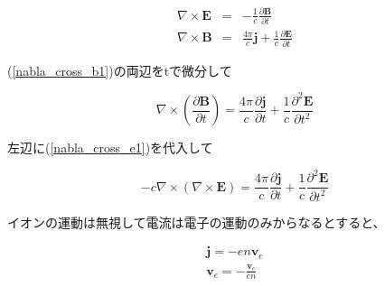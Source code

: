 \documentclass[18pt]{jsarticle}
\begin{document}
\begin{eqnarray}
    \label{nabla_cross_e1}
    \nabla\times\bm{E} &=& -\frac{1}{c}\frac{\partial \bm{B}}{\partial t} \\
    \label{nabla_cross_b1}
    \nabla\times\bm{B} &=& \frac{4\pi}{c}\bm{j}+\frac{1}{c}\frac{\partial \bm{E}}{\partial t} 
\end{eqnarray}

(\ref{nabla_cross_b1})の両辺をtで微分して

\begin{equation}
    \nabla\times\left(\frac{\partial \bm{B}}{\partial t}\right) 
    = \frac{4\pi}{c}\frac{\partial \bm{j}}{\partial t}+\frac{1}{c}\frac{\partial^2 \bm{E}}{\partial t^2} 
\end{equation}

左辺に(\ref{nabla_cross_e1})を代入して

\begin{equation}
    -c\nabla\times(\nabla\times\bm{E}) = \frac{4\pi}{c}\frac{\partial \bm{j}}{\partial t}+\frac{1}{c}\frac{\partial^2 \bm{E}}{\partial t^2} 
\end{equation}

イオンの運動は無視して電流は電子の運動のみからなるとすると、

\begin{eqnarray}
    \bm{j} = -en\bm{v}_e \\
    \label{ve_def}
    \bm{v}_e = -\frac{\bm{v}_e}{en}
\end{eqnarray}
\end{document}
